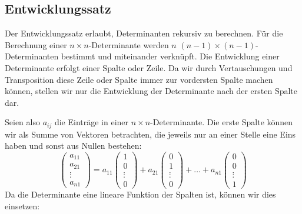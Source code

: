 \subsection{Entwicklungssatz\label{entwicklungssatz}}
Der Entwicklungssatz erlaubt, Determinanten rekursiv zu berechnen.
Für die Berechnung einer $n\times n$-Determinante werden $n$
$(n-1)\times(n-1)$-Determinanten bestimmt und miteinander verknüpft.
Die Entwicklung einer Determinante erfolgt einer Spalte oder Zeile.
Da wir durch Vertauschungen und Transposition diese Zeile oder Spalte
immer zur vordersten Spalte machen können, stellen wir nur die
Entwicklung der Determinante nach der ersten Spalte dar.

Seien also $a_{ij}$ die Einträge in einer $n\times n$-Determinante.
Die erste Spalte können wir als Summe von Vektoren betrachten,
die jeweils nur an einer Stelle eine Eins haben und sonst aus
Nullen bestehen:
\[
\begin{pmatrix}
a_{11}\\a_{21}\\\vdots\\a_{n1}
\end{pmatrix}
=
a_{11}\begin{pmatrix}1\\0\\\vdots\\0\end{pmatrix}
+
a_{21}\begin{pmatrix}0\\1\\\vdots\\0\end{pmatrix}
+
\dots
+
a_{n1}\begin{pmatrix}0\\0\\\vdots\\1\end{pmatrix}
\]
Da die Determinante eine lineare Funktion der Spalten ist,
können wir dies einsetzen:
